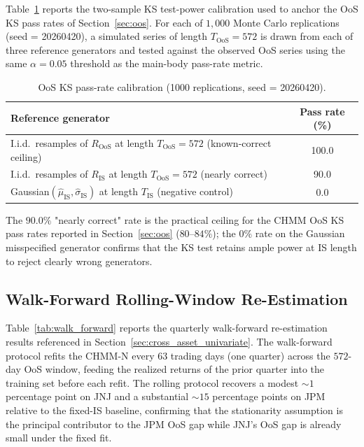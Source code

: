 Table~\ref{tab:ks_power} reports the two-sample KS test-power calibration used to anchor the OoS KS pass rates of Section~\ref{sec:oos}.
For each of $1{,}000$ Monte Carlo replications (seed = 20260420), a simulated series of length $T_{\text{OoS}} = 572$ is drawn from each of three reference generators and tested against the observed OoS series using the same $\alpha = 0.05$ threshold as the main-body pass-rate metric.

\begin{table}[h]
\centering
\small
\caption{OoS KS pass-rate calibration (1000 replications, seed = 20260420).}
\label{tab:ks_power}
\begin{tabular}{l c}
\toprule
Reference generator & Pass rate (\%) \\
\midrule
I.i.d.\ resamples of $R_{\text{OoS}}$ at length $T_{\text{OoS}} = 572$ (known-correct ceiling) & 100.0 \\
I.i.d.\ resamples of $R_{\text{IS}}$ at length $T_{\text{OoS}} = 572$ (nearly correct)          & 90.0  \\
Gaussian$(\hat\mu_{\text{IS}}, \hat\sigma_{\text{IS}})$ at length $T_{\text{IS}}$ (negative control) & 0.0 \\
\bottomrule
\end{tabular}
\end{table}

The $90.0\%$ "nearly correct" rate is the practical ceiling for the CHMM OoS KS pass rates reported in Section~\ref{sec:oos} ($80$--$84\%$); the $0\%$ rate on the Gaussian misspecified generator confirms that the KS test retains ample power at IS length to reject clearly wrong generators.

\subsection{Walk-Forward Rolling-Window Re-Estimation}
\label{sec:walk_forward}

Table~\ref{tab:walk_forward} reports the quarterly walk-forward re-estimation results referenced in Section~\ref{sec:cross_asset_univariate}.
The walk-forward protocol refits the CHMM-N every $63$ trading days (one quarter) across the $572$-day OoS window, feeding the realized returns of the prior quarter into the training set before each refit.
The rolling protocol recovers a modest $\sim 1$ percentage point on JNJ and a substantial $\sim 15$ percentage points on JPM relative to the fixed-IS baseline, confirming that the stationarity assumption is the principal contributor to the JPM OoS gap while JNJ's OoS gap is already small under the fixed fit.

